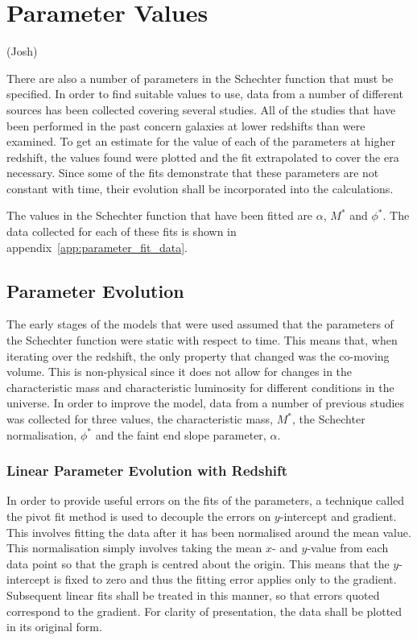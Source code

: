 
\section{Parameter Values} %
\label{sec:parameter_values}
(Josh)

	There are also a number of parameters in the Schechter function that must be specified. In order to find suitable values to use, data from a number of different sources has been collected covering several studies. All of the studies that have been performed in the past concern galaxies at lower redshifts than were examined. To get an estimate for the value of each of the parameters at higher redshift, the values found were plotted and the fit extrapolated to cover the era necessary. Since some of the fits demonstrate that these parameters are not constant with time, their evolution shall be incorporated into the calculations.

	The values in the Schechter function that have been fitted are $\alpha$, $M^{*}$ and $\phi^{*}$. The data collected for each of these fits is shown in appendix~\ref{app:parameter_fit_data}.

	\subsection{Parameter Evolution} %
	\label{sub:parameter_evolution}
		The early stages of the models that were used assumed that the parameters of the Schechter function were static with respect to time. This means that, when iterating over the redshift, the only property that changed was the co-moving volume. This is non-physical since it does not allow for changes in the characteristic mass and characteristic luminosity for different conditions in the universe. In order to improve the model, data from a number of previous studies was collected for three values, the characteristic mass, $M^*$, the Schechter normalisation, $\phi^*$ and the faint end slope parameter, $\alpha$.

		\subsubsection{Linear Parameter Evolution with Redshift} %
		\label{ssub:linear_parameter_evolution_with_redshift}
			In order to provide useful errors on the fits of the parameters, a technique called the pivot fit method is used to decouple the errors on $y$-intercept and gradient. This involves fitting the data after it has been normalised around the mean value. This normalisation simply involves taking the mean $x$- and $y$-value from each data point so that the graph is centred about the origin. This means that the $y$-intercept is fixed to zero and thus the fitting error applies only to the gradient. Subsequent linear fits shall be treated in this manner, so that errors quoted correspond to the gradient. For clarity of presentation, the data shall be plotted in its original form.

